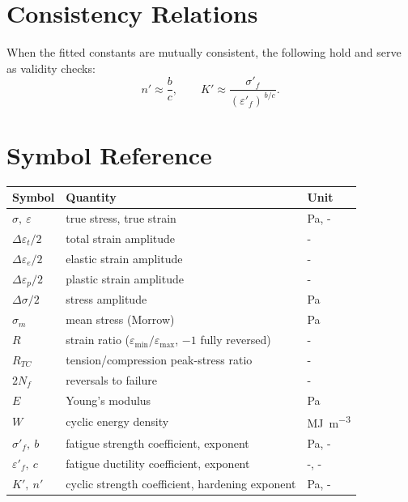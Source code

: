 \documentclass[11pt]{article}
\begin{document}
\section{Consistency Relations}

When the fitted constants are mutually consistent, the following hold and serve as validity
checks:
\begin{equation}
  n' \approx \frac{b}{c},
  \qquad
  K' \approx \frac{\sigma'_f}{(\varepsilon'_f)^{\,b/c}}.
\end{equation}

\section{Symbol Reference}

\begin{table}[h]
\centering
\begin{tabular}{lll}
\toprule
Symbol & Quantity & Unit \\
\midrule
$\sigma,\ \varepsilon$ & true stress, true strain & \si{\pascal}, - \\
$\Delta\varepsilon_t/2$ & total strain amplitude & - \\
$\Delta\varepsilon_e/2$ & elastic strain amplitude & - \\
$\Delta\varepsilon_p/2$ & plastic strain amplitude & - \\
$\Delta\sigma/2$ & stress amplitude & \si{\pascal} \\
$\sigma_m$ & mean stress (Morrow) & \si{\pascal} \\
$R$ & strain ratio ($\varepsilon_{\min}/\varepsilon_{\max}$, $-1$ fully reversed) & - \\
$R_{TC}$ & tension/compression peak-stress ratio & - \\
$2N_f$ & reversals to failure & - \\
$E$ & Young's modulus & \si{\pascal} \\
$W$ & cyclic energy density & \si{\mega\joule\per\cubic\meter} \\
$\sigma'_f,\ b$ & fatigue strength coefficient, exponent & \si{\pascal}, - \\
$\varepsilon'_f,\ c$ & fatigue ductility coefficient, exponent & -, - \\
$K',\ n'$ & cyclic strength coefficient, hardening exponent & \si{\pascal}, - \\
\bottomrule
\end{tabular}
\end{table}
\end{document}
